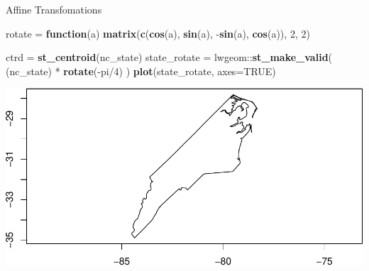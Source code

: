 \documentclass[11pt,ignorenonframetext,]{beamer}
\newenvironment{Shaded}{}{}
\newcommand{\ControlFlowTok}[1]{\textcolor[rgb]{0.00,0.44,0.13}{\textbf{#1}}}
\newcommand{\DataTypeTok}[1]{\textcolor[rgb]{0.56,0.13,0.00}{#1}}
\newcommand{\DecValTok}[1]{\textcolor[rgb]{0.25,0.63,0.44}{#1}}
\newcommand{\KeywordTok}[1]{\textcolor[rgb]{0.00,0.44,0.13}{\textbf{#1}}}
\newcommand{\NormalTok}[1]{#1}
\newcommand{\OperatorTok}[1]{\textcolor[rgb]{0.40,0.40,0.40}{#1}}
\newcommand{\OtherTok}[1]{\textcolor[rgb]{0.00,0.44,0.13}{#1}}
\newcommand{\StringTok}[1]{\textcolor[rgb]{0.25,0.44,0.63}{#1}}
\let\oldShaded\Shaded
\let\endoldShaded\endShaded
\renewenvironment{Shaded}{\footnotesize\begin{spacing}{0.9}\oldShaded}{\endoldShaded\end{spacing}}
\let\oldverbatim\verbatim
\let\endoldverbatim\endverbatim
\newcommand{\scriptoutput}{
  \renewenvironment{Shaded}{\scriptsize\begin{spacing}{0.9}\oldShaded}{\endoldShaded\end{spacing}}
  \renewenvironment{verbatim}{\scriptsize\begin{spacing}{0.9}\oldverbatim}{\endoldverbatim\end{spacing}}
}
\begin{document}
\begin{frame}[fragile,t]{Affine Transfomations}
\protect\hypertarget{affine-transfomations}{}

\scriptoutput

\begin{Shaded}
\begin{Highlighting}[]
\NormalTok{rotate =}\StringTok{ }\ControlFlowTok{function}\NormalTok{(a) }\KeywordTok{matrix}\NormalTok{(}\KeywordTok{c}\NormalTok{(}\KeywordTok{cos}\NormalTok{(a), }\KeywordTok{sin}\NormalTok{(a), }\OperatorTok{-}\KeywordTok{sin}\NormalTok{(a), }\KeywordTok{cos}\NormalTok{(a)), }\DecValTok{2}\NormalTok{, }\DecValTok{2}\NormalTok{)}

\NormalTok{ctrd =}\StringTok{ }\KeywordTok{st_centroid}\NormalTok{(nc_state)}
\NormalTok{state_rotate =}\StringTok{ }\NormalTok{lwgeom}\OperatorTok{::}\KeywordTok{st_make_valid}\NormalTok{( (nc_state) }\OperatorTok{*}\StringTok{ }\KeywordTok{rotate}\NormalTok{(}\OperatorTok{-}\NormalTok{pi}\OperatorTok{/}\DecValTok{4}\NormalTok{) )}
\KeywordTok{plot}\NormalTok{(state_rotate, }\DataTypeTok{axes=}\OtherTok{TRUE}\NormalTok{)}
\end{Highlighting}
\end{Shaded}

\begin{center}\includegraphics[width=\textwidth]{Lec16_files/figure-beamer/unnamed-chunk-27-1} \end{center}

\end{frame}
\end{document}

